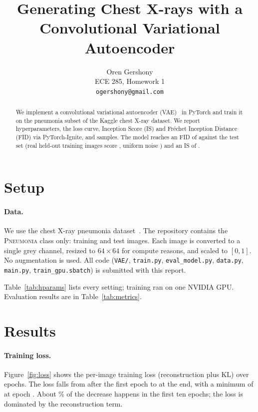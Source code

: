 \documentclass{article}
\title{Generating Chest X-rays with a Convolutional Variational Autoencoder}
\author{%
  Oren Gershony \\
  ECE 285, Homework 1 \\
  \texttt{ogershony@gmail.com}
}
\begin{document}
\maketitle

\begin{abstract}
We implement a convolutional variational autoencoder (VAE)~\cite{kingma2014} in PyTorch and train it on the
pneumonia subset of the Kaggle chest X-ray dataset. We report hyperparameters, the loss curve,
Inception Score (IS) and Fr\'echet Inception Distance (FID) via PyTorch-Ignite, and samples. The model reaches an FID of \FID{} against
the test set (real held-out training images score \FIDRealRef{}, uniform noise \FIDNoiseRef{}) and an
IS of \IS{}.
\end{abstract}

\section{Setup}

\paragraph{Data.}
We use the chest X-ray pneumonia dataset~\cite{kermany2018}. The repository contains the
\textsc{Pneumonia} class only: \NumTrain{} training and \NumTest{} test images. Each image is
converted to a single grey channel, resized to $64{\times}64$ for compute reasons, and scaled to
$[0,1]$. No augmentation is used. All code (\texttt{VAE/}, \texttt{train.py}, \texttt{eval\_model.py},
\texttt{data.py}, \texttt{main.py}, \texttt{train\_gpu.sbatch}) is submitted with this report.

Table~\ref{tab:hparams} lists every setting; training ran on one NVIDIA \Device{} GPU.
Evaluation results are in Table~\ref{tab:metrics}.

\section{Results}

\paragraph{Training loss.}
Figure~\ref{fig:loss} shows the per-image training loss (reconstruction plus KL) over
\NumEpochs{} epochs. The loss falls from \InitLoss{} after the first epoch to \FinalLoss{} at
the end, with a minimum of \MinLoss{} at epoch \MinLossEpoch. About \LossDropTenPct\% of the decrease
happens in the first ten epochs; the loss is dominated by the reconstruction term.
\end{document}
